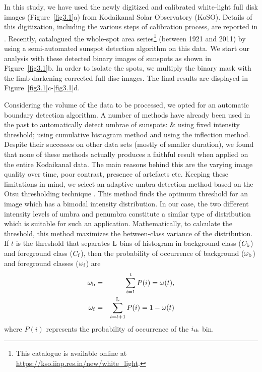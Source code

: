 In this study, we have used the newly digitized and calibrated white-light full disk images (Figure~\ref{fig3.1}a) from Kodaikanal Solar Observatory (KoSO). Details of this digitization, including the various steps of calibration process, are reported in \cite{Ravindra2013}. Recently, \cite{Mandal2017a} catalogued the whole-spot area series\footnote{This catalogue is available online at \url{https://kso.iiap.res.in/new/white_light}.} (between 1921 and 2011) by using a semi-automated sunspot detection algorithm on this data. We start our analysis with these detected binary images of sunspots as shown in Figure~\ref{fig3.1}b. In order to isolate the spots, we multiply the binary mask with the limb-darkening corrected full disc images. The final results are displayed in Figure~\ref{fig3.1}c-\ref{fig3.1}d. 


Considering the volume of the data to be processed, we opted for an automatic boundary detection algorithm. A number of methods have already been used in the past to automatically detect umbrae of sunspots: \cite{Brandt1990} \& \cite{Pucha2016} using fixed intensity threshold; \cite{Pettauer1997} using cumulative histogram method and \cite{Steinegger1997a} using the inflection method. Despite their successes on other data sets (mostly of smaller duration), we found that none of these methods actually produces a faithful result when applied on the entire Kodaikanal data. The main reasons behind this are the varying image quality over time, poor contrast, presence of artefacts etc. Keeping these limitations in mind, we select an adaptive umbra detection method based on the Otsu thresholding technique \citep{Otsu1979}.
This method finds the optimum threshold for an image which has a bimodal intensity distribution. In our case, the two different intensity levels of umbra and penumbra constitute a similar type of distribution which is suitable for such an application. Mathematically, to calculate the threshold, this method maximizes the between-class variance of the distribution. If $t$ is the threshold that separates ${\rm L}$ bins of histogram in background class ($C_{\rm b}$) and foreground class ($C_{\rm f}$), then the probability of occurrence of background ($\omega _{\rm b}$) and foreground classes ($\omega _{\rm f}$) are
\begin{eqnarray}
   \omega _{\rm b}&=&\sum _{i=1}^{{\rm t}}P(i)=\omega(t),\\
   \omega _{\rm f}&=&\sum _{{i=t+1}}^{{\rm L}}P(i)=1-\omega(t)
\end{eqnarray}
where $P(i)$ represents the probability of occurrence of the $i_{\rm th}$ bin.
